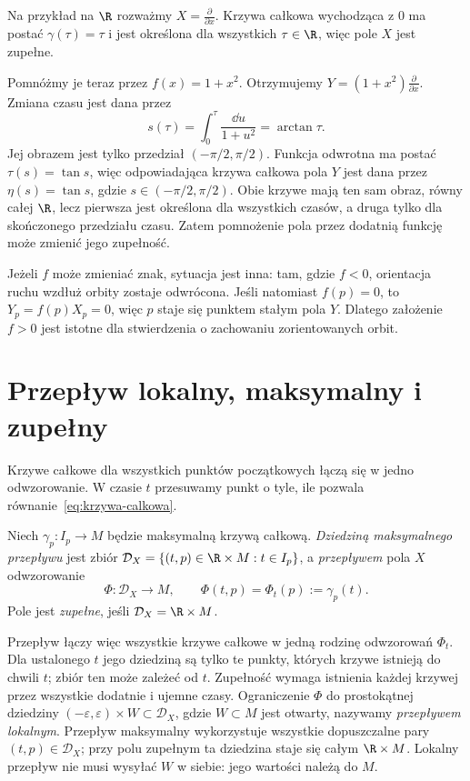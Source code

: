 \begin{przyklad}
Na przykład na $\R$ rozważmy $X=\frac{\partial}{\partial x}$.
Krzywa całkowa wychodząca z $0$ ma postać $\gamma(\tau)=\tau$
i jest określona dla wszystkich $\tau\in\R$, więc pole $X$ jest zupełne.

Pomnóżmy je teraz przez $f(x)=1+x^2$. Otrzymujemy
$Y=(1+x^2)\frac{\partial}{\partial x}$.
Zmiana czasu jest dana przez
\[
s(\tau)=\int_0^\tau\frac{\dd u}{1+u^2}=\arctan\tau.
\]
Jej obrazem jest tylko przedział $(-\pi/2,\pi/2)$.
Funkcja odwrotna ma postać $\tau(s)=\tan s$, więc odpowiadająca
krzywa całkowa pola $Y$ jest dana przez
$\eta(s)=\tan s$, gdzie $s\in(-\pi/2,\pi/2)$.
Obie krzywe mają ten sam obraz, równy całej $\R$, lecz pierwsza jest
określona dla wszystkich czasów, a druga tylko dla skończonego
przedziału czasu. Zatem pomnożenie pola przez dodatnią funkcję może
zmienić jego zupełność.

Jeżeli $f$ może zmieniać znak, sytuacja jest inna: tam, gdzie $f<0$,
orientacja ruchu wzdłuż orbity zostaje odwrócona. Jeśli natomiast
$f(p)=0$, to $Y_p=f(p)X_p=0$, więc $p$ staje się punktem stałym
pola $Y$. Dlatego założenie $f>0$ jest istotne dla stwierdzenia
o zachowaniu zorientowanych orbit.
\end{przyklad}


\section{Przepływ lokalny, maksymalny i zupełny}
\label{sec:przeplyw}

Krzywe całkowe dla wszystkich punktów początkowych łączą się
w jedno odwzorowanie. W czasie $t$ przesuwamy punkt o tyle, ile
pozwala równanie~\eqref{eq:krzywa-calkowa}.

\begin{definicja}
Niech $\gamma_p\colon I_p\to M$ będzie maksymalną krzywą całkową.
\emph{Dziedziną maksymalnego przepływu} jest zbiór
$\mathcal D_X=\{(t,p)\in\R\times M:t\in I_p\}$, a
\emph{przepływem} pola $X$ odwzorowanie
\[
 \Phi\colon\mathcal D_X\to M,\qquad \Phi(t,p)=\Phi_t(p):=\gamma_p(t).
\]
Pole jest \emph{zupełne}, jeśli $\mathcal D_X=\R\times M$.
\end{definicja}

Przepływ łączy więc wszystkie krzywe całkowe w jedną rodzinę
odwzorowań $\Phi_t$. Dla ustalonego $t$ jego dziedziną są tylko
te punkty, których krzywe istnieją do chwili $t$; zbiór ten
może zależeć od $t$. Zupełność wymaga istnienia każdej krzywej
przez wszystkie dodatnie i ujemne czasy.
Ograniczenie $\Phi$ do prostokątnej dziedziny
$(-\varepsilon,\varepsilon)\times W\subset\mathcal D_X$,
gdzie $W\subset M$ jest otwarty, nazywamy \emph{przepływem lokalnym}.
Przepływ maksymalny wykorzystuje wszystkie dopuszczalne pary
$(t,p)\in\mathcal D_X$; przy polu zupełnym ta dziedzina staje się
całym $\R\times M$. Lokalny przepływ nie musi wysyłać $W$ w siebie:
jego wartości należą do $M$.

